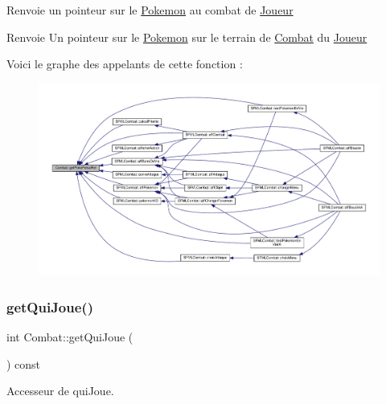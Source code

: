 Renvoie un pointeur sur le \hyperlink{class_pokemon}{Pokemon} au combat de \hyperlink{class_joueur}{Joueur} \begin{DoxyReturn}{Renvoie}
Un pointeur sur le \hyperlink{class_pokemon}{Pokemon} sur le terrain de \hyperlink{class_combat}{Combat} du \hyperlink{class_joueur}{Joueur} 
\end{DoxyReturn}
Voici le graphe des appelants de cette fonction \+:\nopagebreak
\begin{figure}[H]
\begin{center}
\leavevmode
\includegraphics[width=350pt]{class_combat_a9a44a83a9c1fe5d67f0b620dab547e56_icgraph}
\end{center}
\end{figure}
\mbox{\label{class_combat_aed2119127fb9b7ed023dd481927c27aa}} 
\subsubsection{\texorpdfstring{get\+Qui\+Joue()}{getQuiJoue()}}
{\footnotesize\ttfamily int Combat\+::get\+Qui\+Joue (\begin{DoxyParamCaption}{ }\end{DoxyParamCaption}) const}



Accesseur de qui\+Joue. 

